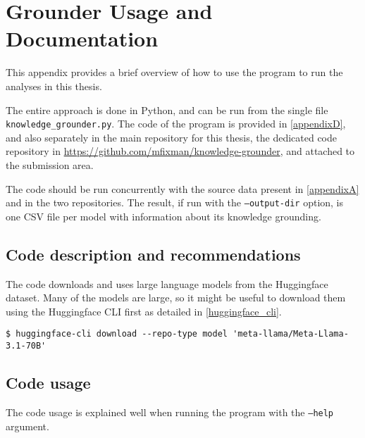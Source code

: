 \section{Grounder Usage and Documentation}
\label{appendixC}


This appendix provides a brief overview of how to use the program to run the analyses in this thesis.

The entire approach is done in Python, and can be run from the single file \texttt{knowledge\_grounder.py}.
The code of the program is provided in \cref{appendixD}, and also separately in the main repository for this thesis, the dedicated code repository in \url{https://github.com/mfixman/knowledge-grounder}, and attached to the submission area.

The code should be run concurrently with the source data present in \cref{appendixA} and in the two repositories.
The result, if run with the \texttt{--output-dir} option, is one CSV file per model with information about its knowledge grounding.

\subsection{Code description and recommendations}

The code downloads and uses large language models from the Huggingface dataset.
Many of the models are large, so it might be useful to download them using the Huggingface CLI first as detailed in \cref{huggingface_cli}.

\begin{lstlisting}[label={huggingface_cli}]
$ huggingface-cli download --repo-type model 'meta-llama/Meta-Llama-3.1-70B'
\end{lstlisting}

\subsection{Code usage}

The code usage is explained well when running the program with the \texttt{--help} argument.

